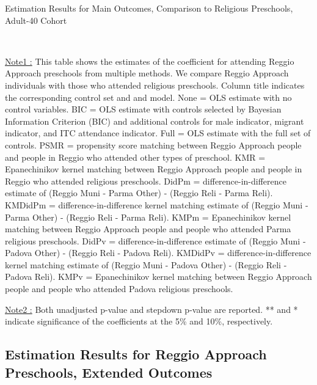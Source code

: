 \begin{table}[H] \caption{Estimation Results for Main Outcomes, Comparison to Religious Preschools, Adult-40 Cohort} \label{ols-M-adult40-reg-reli}
\scalebox{0.59}{}
\vspace{1ex} \\
\footnotesize\raggedright{\underline{Note1 :} This table shows the estimates of the coefficient for attending Reggio Approach preschools from multiple methods. We compare Reggio Approach individuals with those who attended religious preschools. Column title indicates the corresponding control set and and model. None = OLS estimate with no control variables. BIC = OLS estimate with controls selected by Bayesian Information Criterion (BIC) and additional controls for male indicator, migrant indicator, and ITC attendance indicator. Full = OLS estimate with the full set of controls. PSMR =  propensity score matching between Reggio Approach people and people in Reggio who attended other types of preschool. KMR = Epanechinikov kernel matching between Reggio Approach people and people in Reggio who attended religious preschools. DidPm = difference-in-difference estimate of (Reggio Muni - Parma Other) - (Reggio Reli - Parma Reli). KMDidPm = difference-in-difference kernel matching estimate of (Reggio Muni - Parma Other) - (Reggio Reli - Parma Reli). KMPm = Epanechinikov kernel matching between Reggio Approach people and people who attended Parma religious preschools. DidPv = difference-in-difference estimate of (Reggio Muni - Padova Other) - (Reggio Reli - Padova Reli). KMDidPv = difference-in-difference kernel matching estimate of (Reggio Muni - Padova Other) - (Reggio Reli - Padova Reli).  KMPv = Epanechinikov kernel matching between Reggio Approach people and people who attended Padova religious preschools.}

\footnotesize\raggedright{\underline{Note2 :} Both unadjusted p-value and stepdown p-value are reported. ** and * indicate significance of the coefficients at the 5\% and 10\%, respectively.}

\end{table}



\subsection{Estimation Results for Reggio Approach Preschools, Extended Outcomes}  \label{appsec:extended-outcome}
